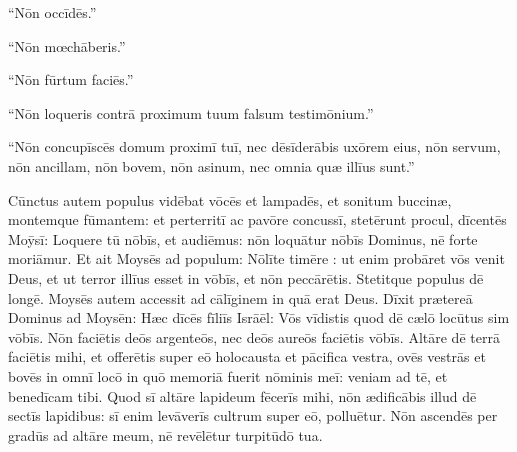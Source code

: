 ``Nōn occīdēs.''

``Nōn mœchāberis.''

``Nōn fūrtum faciēs.''

``Nōn loqueris contrā proximum tuum falsum testimōnium.''

``Nōn concupīscēs domum
proximī tuī, nec dēsīderābis uxōrem eius, nōn servum, nōn ancillam, nōn
bovem, nōn asinum, nec omnia quæ illīus sunt.''

Cūnctus autem populus
vidēbat vōcēs et lampadēs, et sonitum buccinæ, montemque
fūmantem: et perterritī ac pavōre concussī, stetērunt procul, 
dīcentēs
Moȳsī: Loquere tū nōbīs, et audiēmus: nōn loquātur nōbīs Dominus, nē
forte moriāmur. 
Et ait Moysēs ad populum: Nōlīte timēre
: ut enim probāret vōs venit Deus, et ut terror illīus
esset in vōbīs, et nōn peccārētis. 
Stetitque populus dē longē. Moysēs autem accessit ad
cālīginem in quā erat Deus. 
Dīxit prætereā Dominus ad
Moysēn: Hæc dīcēs fīliīs Isrāēl: Vōs
vīdistis quod dē cælō locūtus sim vōbīs. 
Nōn faciētis deōs argenteōs,
nec deōs aureōs faciētis vōbīs. 
Altāre dē terrā faciētis mihi, et
offerētis super eō holocausta et
pācifica vestra, ovēs vestrās et bovēs
in omnī locō in quō memoriā fuerit nōminis meī: veniam ad tē, et
benedīcam tibi. 
Quod sī altāre lapideum
fēcerīs mihi, nōn ædificābis illud dē sectīs lapidibus: sī
enim levāverīs cultrum super eō, polluētur. 
Nōn ascendēs
per gradūs ad altāre meum, nē revēlētur
turpitūdō tua.
